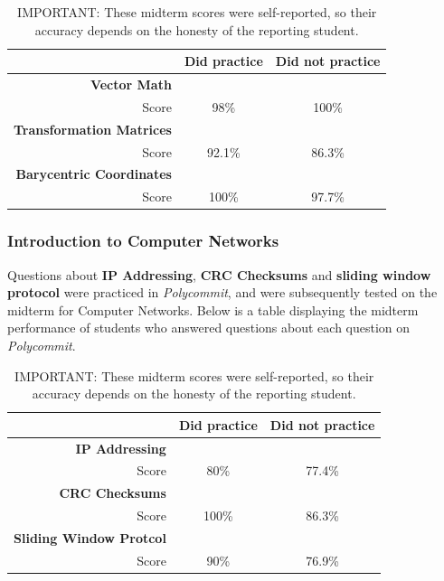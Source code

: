 \begin{table}
	\begin{tabular}[h!]{ r c c }
		& \textbf{Did practice} & \textbf{Did not practice} \\
		\hline
		\textbf{Vector Math} & & \\
		Score & 98\% & 100\%  \\
		
		\hline
		\textbf{Transformation Matrices} & &  \\
		Score  & 92.1\% & 86.3\% \\
		
		\hline
		\textbf{Barycentric Coordinates} & &  \\
		Score  & 100\% & 97.7\% \\
		
	\end{tabular}
\caption{IMPORTANT: These midterm scores were self-reported, so their accuracy depends on the honesty of the reporting student.}
\end{table}

\subsubsection{Introduction to Computer Networks}

\par Questions about \textbf{IP Addressing}, \textbf{CRC Checksums} and \textbf{sliding window protocol} were practiced in \textit{Polycommit}, and were subsequently tested on the midterm for Computer Networks. Below is a table displaying the midterm performance of students who answered questions about each question on \textit{Polycommit}.

\begin{table}
	\begin{tabular}[h!]{ r c c }
		& \textbf{Did practice} & \textbf{Did not practice} \\
		\hline
		\textbf{IP Addressing} & & \\
		Score & 80\% & 77.4\%  \\
		
		\hline
		\textbf{CRC Checksums} & &  \\
		Score  & 100\% & 86.3\% \\
		
		\hline
		\textbf{Sliding Window Protcol} & &  \\
		Score  & 90\% & 76.9\% \\
		
	\end{tabular}
\caption{IMPORTANT: These midterm scores were self-reported, so their accuracy depends on the honesty of the reporting student.}
\end{table}


